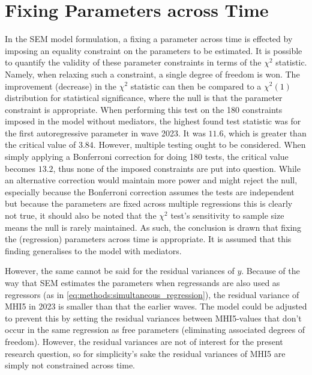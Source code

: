 \section{Fixing Parameters across Time}
\label{sec:modelling:parameter_fixing}
In the SEM model formulation, a fixing a parameter across time is effected by imposing an equality constraint on the
parameters to be estimated.
It is possible to quantify the validity of these parameter constraints in terms of the $\chi^2$ statistic.
Namely, when relaxing such a constraint, a single degree of freedom is won. The improvement (decrease) in the $\chi^2$
statistic can then be compared to a $\chi^2(1)$ distribution for statistical significance, where the null is
that the parameter constraint is appropriate.
When performing this test on the 180 constraints imposed in the model without mediators, the highest found test
statistic was for the first autoregressive parameter in wave 2023. It was $11.6$, which is greater than the critical
value of $3.84$. However, multiple testing ought to be considered.
When simply applying a Bonferroni correction for doing 180 tests, the critical value becomes $13.2$, thus none of the
imposed constraints are put into question.
While an alternative correction would maintain more power and might reject the null, especially because
the Bonferroni correction assumes the tests are independent but because the parameters are fixed across multiple
regressions this is clearly not true, it should also be noted that
the $\chi^2$ test's sensitivity to sample size means the null is rarely maintained. As such, the conclusion is drawn
that fixing the (regression) parameters across time is appropriate.
It is assumed that this finding generalises to the model with mediators.

However, the same cannot be said for the residual variances of $y$. Because of the way that SEM estimates the
parameters when regressands are also used as regressors (as in \cref{eq:methods:simultaneous_regression}),
the residual variance of MHI5 in 2023 is smaller than that the earlier waves. The model could be adjusted
to prevent this by setting the residual variances between MHI5-values that don't occur in the same regression as free
parameters (eliminating associated degrees of freedom). However, the residual variances are not of interest for the present
research question, so for simplicity's sake the residual variances of MHI5 are simply not constrained across time.
